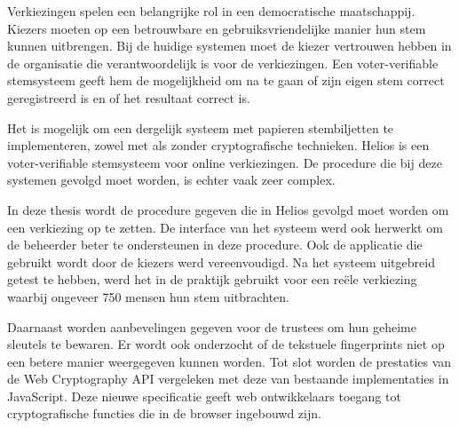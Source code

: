 %
%

Verkiezingen spelen een belangrijke rol in een democratische maatschappij. Kiezers moeten op een betrouwbare en gebruiksvriendelijke manier hun stem kunnen uitbrengen. Bij de huidige systemen moet de kiezer vertrouwen hebben in de organisatie die verantwoordelijk is voor de verkiezingen. Een voter-verifiable stemsysteem geeft hem de mogelijkheid om na te gaan of zijn eigen stem correct geregistreerd is en of het resultaat correct is.

\npar Het is mogelijk om een dergelijk systeem met papieren stembiljetten te implementeren, zowel met als zonder cryptografische technieken. Helios is een voter-verifiable stemsysteem voor online verkiezingen. De procedure die bij deze systemen gevolgd moet worden, is echter vaak zeer complex.

\npar In deze thesis wordt de procedure gegeven die in Helios gevolgd moet worden om een verkiezing op te zetten. De interface van het systeem werd ook herwerkt om de beheerder beter te ondersteunen in deze procedure. Ook de applicatie die gebruikt wordt door de kiezers werd vereenvoudigd. Na het systeem uitgebreid getest te hebben, werd het in de praktijk gebruikt voor een re\"ele verkiezing waarbij ongeveer 750 mensen hun stem uitbrachten.

\npar Daarnaast worden aanbevelingen gegeven voor de trustees om hun geheime sleutels te bewaren. Er wordt ook onderzocht of de tekstuele fingerprints niet op een betere manier weergegeven kunnen worden. Tot slot worden de prestaties van de Web Cryptography API vergeleken met deze van bestaande implementaties in JavaScript. Deze nieuwe specificatie geeft web ontwikkelaars toegang tot cryptografische functies die in de browser ingebouwd zijn.